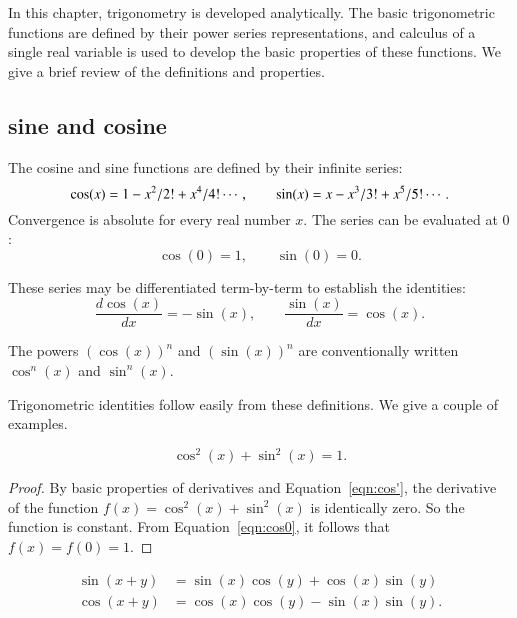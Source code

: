 



In this chapter, trigonometry is developed analytically.  The basic
trigonometric functions are defined by their power series
representations, and calculus of a single real variable is used to
develop the basic properties of these functions.  We give a brief
review of the definitions and properties.


\subsection{sine and cosine}

The cosine and sine functions are defined by their infinite series:
    \begin{equation}\label{eqn:cos-def}\cos(x) = 1 - x^2/2! + x^4/4! \cdots,\qquad
  \sin(x) = x - x^3/3! + x^5/5! \cdots.
    \index{cos}\index{cosine}\index{sin}\index{sine}
    \end{equation}
Convergence is absolute for every real number $x$.
The series can be evaluated at $0$:
    \begin{equation}\label{eqn:cos0}
    \cos(0) = 1,\qquad \sin(0) = 0.
    \end{equation}

These series may be differentiated term-by-term to establish the identities:
    \begin{equation}\label{eqn:cos'}
    \frac{d \cos(x)}{dx} = -\sin(x),\qquad \frac{ \sin(x)}{dx} = \cos(x).
    \end{equation}

The powers $(\cos(x))^n$ and $(\sin(x))^n$ are conventionally written
$\cos^n(x)$ and $\sin^n(x)$.

Trigonometric identities follow easily from these definitions.  We
give a couple of examples.

\begin{lemma}\label{lemma:circle}
   $$\cos^2(x) + \sin^2(x) = 1.$$
\end{lemma}

\begin{proof}
By basic properties of derivatives and Equation~\ref{eqn:cos'},
the derivative of the function $f(x) = \cos^2(x) +\sin^2(x)$ is
identically zero.   So the function is constant.  From
Equation~\ref{eqn:cos0}, it follows that $f(x)=f(0)=1$.
\end{proof}

\begin{lemma}\label{lemma:sin-add}
  $$\begin{array}{lll}
  \sin(x+y) &= \sin(x)\cos(y) + \cos(x)\sin(y)\\
  \cos(x+y)  &= \cos(x)\cos(y) - \sin(x)\sin(y).
  \end{array}$$
\end{lemma}

